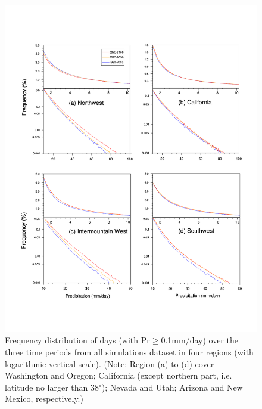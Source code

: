 \documentclass{ametsoc}
\begin{document}
\begin{figure}
\begin{center}
\includegraphics[width=6in]{PP_PDF_region1_4.pdf}
\caption{Frequency distribution of days (with Pr$\geq$0.1mm$/$day) over the three time periods from all simulations dataset in four regions (with logarithmic vertical scale). (Note: Region (a) to (d) cover Washington and Oregon; California (except northern part, i.e. latitude no larger than 38$^\circ$); Nevada and Utah; Arizona and New Mexico, respectively.)}
\label{fig:prPDF}
\end{center}
\end{figure}
\end{document}
